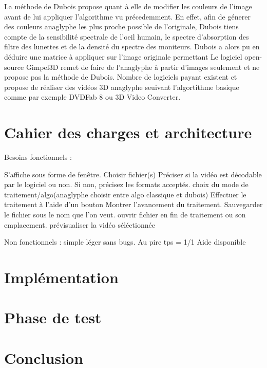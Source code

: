 \documentclass[10pt,a4paper]{article}
\begin{document}
La méthode de Dubois propose quant à elle de modifier les couleurs de l'image avant de lui appliquer l'algorithme vu précedemment.
En effet, afin de génerer des couleurs anaglyphe les plus proche possible de l'originale, Dubois tiens compte de la sensibilité spectrale de l'oeil humain,
le spectre d'absorption des filtre des lunettes et de la densité du spectre des moniteurs.
Dubois a alors pu en déduire une matrice à appliquer sur l'image originale permettant
Le logiciel open-source Gimpel3D remet de faire de l'anaglyphe à partir d'images seulement et ne propose pas la méthode de Dubois. Nombre de logiciels payant existent et propose de réaliser des vidéos 3D
anaglyphe seuivant l'algortithme basique comme par exemple DVDFab 8 ou  3D Video Converter.

\section{Cahier des charges et architecture}

Besoins fonctionnels :

S'affiche sous forme de fenêtre.
Choisir fichier(s)
Préciser si la vidéo est décodable par le logiciel ou non. Si non, précisez les formats acceptés.
choix du mode de traitement/algo(anaglyphe choisir entre algo classique et dubois)
Effectuer le traitement à l'aide d'un bouton
Montrer l'avancement du traitement.
Sauvegarder le fichier sous le nom que l'on veut.
ouvrir fichier en fin de traitement ou son emplacement.
prévisualiser la vidéo séléctionnée

Non fonctionnels :
simple
léger
sans bugs.
Au pire tps = 1/1
Aide disponible
\section{Implémentation}
\section{Phase de test}

\section{Conclusion}
\end{document}
